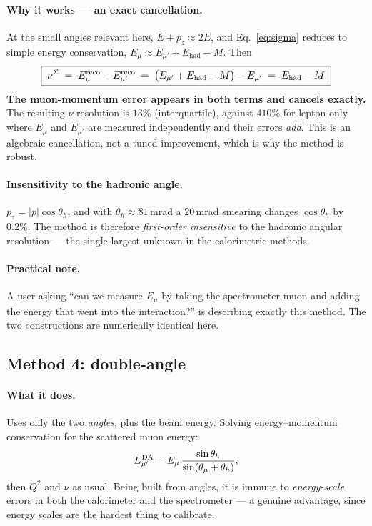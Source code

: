 \documentclass[11pt,a4paper]{article}
\newcommand{\Ein}{E_{\mu}}
\newcommand{\Eout}{E_{\mu'}}
\newcommand{\Ehad}{E_{\mathrm{had}}}
\newcommand{\thmu}{\theta_{\mu}}
\newcommand{\thh}{\theta_{h}}
\begin{document}
\paragraph{Why it works --- an exact cancellation.} At the small angles relevant
here, $E+p_z\approx 2E$, and Eq.~\ref{eq:sigma} reduces to simple energy
conservation, $\Ein \approx \Eout + \Ehad - M$. Then
\begin{equation}
  \boxed{\;\nu^{\Sigma} \;=\; \Ein^{\rm reco} - \Eout^{\rm reco}
  \;=\; \bigl(\Eout+\Ehad-M\bigr)-\Eout \;=\; \Ehad - M\;}
\end{equation}
\textbf{The muon-momentum error appears in both terms and cancels exactly.} The
resulting $\nu$ resolution is $13\%$ (interquartile), against $410\%$ for
lepton-only where $\Ein$ and $\Eout$ are measured independently and their errors
\emph{add}. This is an algebraic cancellation, not a tuned improvement, which is
why the method is robust.

\paragraph{Insensitivity to the hadronic angle.} $p_z = |p|\cos\thh$, and with
$\thh\approx81\,$mrad a $20\,$mrad smearing changes $\cos\thh$ by $0.2\%$. The
method is therefore \emph{first-order insensitive} to the hadronic angular
resolution --- the single largest unknown in the calorimetric methods.

\paragraph{Practical note.} A user asking ``can we measure $\Ein$ by taking the
spectrometer muon and adding the energy that went into the interaction?'' is
describing exactly this method. The two constructions are numerically identical
here.

\subsection{Method 4: double-angle}
\label{sec:da}

\paragraph{What it does.} Uses only the two \emph{angles}, plus the beam energy.
Solving energy--momentum conservation for the scattered muon energy:
\begin{equation}
  \Eout^{\rm DA} = \Ein\,\frac{\sin\thh}{\sin(\thmu+\thh)} ,
\end{equation}
then $Q^2$ and $\nu$ as usual. Being built from angles, it is immune to
\emph{energy-scale} errors in both the calorimeter and the spectrometer --- a
genuine advantage, since energy scales are the hardest thing to calibrate.
\end{document}
